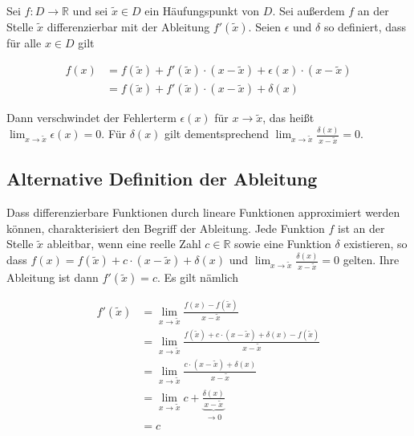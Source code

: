 \documentclass[fontsize=9pt,
               parskip=half-,
               DIV=14,
               listof=chapterentry,
               tocflat]{scrbook}
\begin{document}
\begin{theorem*}
Sei $f:D\to \mathbb {R} $ und sei ${\tilde {x}}\in D$ ein Häufungspunkt von $D$. Sei außerdem $f$ an der Stelle ${\tilde {x}}$ differenzierbar mit der Ableitung $f'({\tilde {x}})$. Seien $\epsilon $ und $\delta $ so definiert, dass für alle $x\in D$ gilt

\begin{align*}
f(x)&=f({\tilde {x}})+f'({\tilde {x}})\cdot (x-{\tilde {x}})+\epsilon (x)\cdot (x-{\tilde {x}})\\[0.3em]&=f({\tilde {x}})+f'({\tilde {x}})\cdot (x-{\tilde {x}})+\delta (x)
\end{align*}

Dann verschwindet der Fehlerterm $\epsilon (x)$ für $x\to {\tilde {x}}$, das heißt $\lim _{x\to {\tilde {x}}}\epsilon (x)=0$. Für $\delta (x)$ gilt dementsprechend $\lim _{x\to {\tilde {x}}}{\tfrac {\delta (x)}{x-{\tilde {x}}}}=0$.

\end{theorem*}

\subsection{Alternative Definition der Ableitung}

Dass differenzierbare Funktionen durch lineare Funktionen approximiert werden können, charakterisiert den Begriff der Ableitung. Jede Funktion $f$ ist an der Stelle ${\tilde {x}}$ ableitbar, wenn eine reelle Zahl $c\in \mathbb {R} $ sowie eine Funktion $\delta $ existieren, so dass $f(x)=f({\tilde {x}})+c\cdot (x-{\tilde {x}})+\delta (x)$ und $\lim _{x\to {\tilde {x}}}{\tfrac {\delta (x)}{x-{\tilde {x}}}}=0$ gelten. Ihre Ableitung ist dann $f'({\tilde {x}})=c$. Es gilt nämlich

\begin{align*}
f'({\tilde {x}})&=\lim _{x\to {\tilde {x}}}{\frac {f(x)-f({\tilde {x}})}{x-{\tilde {x}}}}\\[0.3em]&=\lim _{x\to {\tilde {x}}}{\frac {f({\tilde {x}})+c\cdot (x-{\tilde {x}})+\delta (x)-f({\tilde {x}})}{x-{\tilde {x}}}}\\[0.3em]&=\lim _{x\to {\tilde {x}}}{\frac {c\cdot (x-{\tilde {x}})+\delta (x)}{x-{\tilde {x}}}}\\[0.3em]&=\lim _{x\to {\tilde {x}}}c+\underbrace {\frac {\delta (x)}{x-{\tilde {x}}}} _{\to 0}\\[0.3em]&=c
\end{align*}
\end{document}
